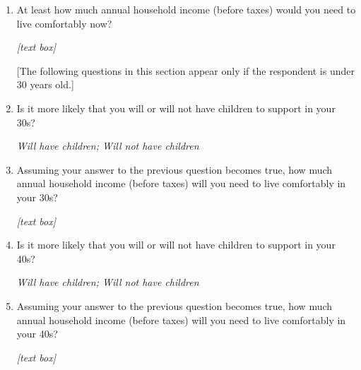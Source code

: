 \documentclass[11pt, headsepline]{article}
\begin{document}
\begin{enumerate}[resume]
    \item At least how much annual household income (before taxes) would you need to live comfortably now?

    \textit{[text box]}


    [The following questions in this section appear only if the respondent is under 30 years old.]
    
    \item Is it more likely that you will or  will not have children to support in your 30s?

    \textit{Will have children; Will not have children}

    \item Assuming your answer to the previous question becomes true, how much annual household income (before taxes) will you need to live comfortably in your 30s?

    \textit{[text box]}


    \item Is it more likely that you will or will not have children to support in your 40s?

    \textit{Will have children; Will not have children}

    \item Assuming your answer to the previous question becomes true, how much annual household income (before taxes) will you need to live comfortably in your 40s?

    \textit{[text box]}

    
\end{enumerate}
\end{document}
